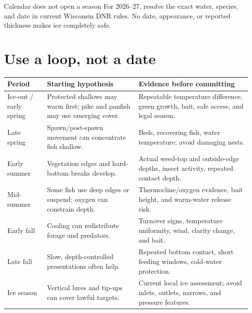 
\begin{teloshazard}{Calendar does not open a season}
For 2026--27, resolve the exact water, species, and date in current Wisconsin
DNR rules. No date, appearance, or reported thickness makes ice completely
safe.
\end{teloshazard}

\section{Use a loop, not a date}
\begin{center}
\end{center}

\begin{longtable}{@{}p{.17\linewidth}p{.31\linewidth}p{.44\linewidth}@{}}
\toprule\textbf{Period}&\textbf{Starting hypothesis}&\textbf{Evidence before committing}\\\midrule
Ice-out / early spring&Protected shallows may warm first; pike and panfish may
use emerging cover.&Repeatable temperature difference, green growth, bait,
safe access, and legal season.\\
Late spring&Spawn/post-spawn movement can concentrate fish shallow.&Beds,
recovering fish, water temperature; avoid damaging nests.\\
Early summer&Vegetation edges and hard-bottom breaks develop.&Actual weed-top
and outside-edge depths, insect activity, repeated contact depth.\\
Mid-summer&Some fish use deep edges or suspend; oxygen can constrain depth.&
Thermocline/oxygen evidence, bait height, and warm-water release risk.\\
Early fall&Cooling can redistribute forage and predators.&Turnover signs,
temperature uniformity, wind, clarity change, and bait.\\
Late fall&Slow, depth-controlled presentations often help.&Repeated bottom
contact, short feeding windows, cold-water protection.\\
Ice season&Vertical lures and tip-ups can cover lawful targets.&Current local
ice assessment; avoid inlets, outlets, narrows, and pressure features.\\
\bottomrule
\end{longtable}

